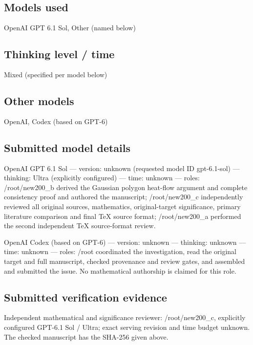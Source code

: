 \documentclass[11pt]{article}
\begin{document}
\subsection{Models used}

OpenAI GPT 6.1 Sol, Other (named below)

\subsection{Thinking level / time}

Mixed (specified per model below)

\subsection{Other models}

OpenAI, Codex (based on GPT-6)

\subsection{Submitted model details}

OpenAI GPT 6.1 Sol  —  version: unknown (requested model ID gpt-6.1-sol)  —  thinking: Ultra (explicitly configured)  —  time: unknown  —  roles: /root/new200\_b derived the Gaussian polygon heat-flow argument and complete consistency proof and authored the manuscript; /root/new200\_c independently reviewed all original sources, mathematics, original-target significance, primary literature comparison and final TeX source format; /root/new200\_a performed the second independent TeX source-format review.

OpenAI Codex (based on GPT-6)  —  version: unknown  —  thinking: unknown  —  time: unknown  —  roles: /root coordinated the investigation, read the original target and full manuscript, checked provenance and review gates, and assembled and submitted the issue. No mathematical authorship is claimed for this role.

\subsection{Submitted verification evidence}

Independent mathematical and significance reviewer: /root/new200\_c, explicitly configured GPT-6.1 Sol / Ultra; exact serving revision and time budget unknown. The checked manuscript has the SHA-256 given above.
\end{document}
